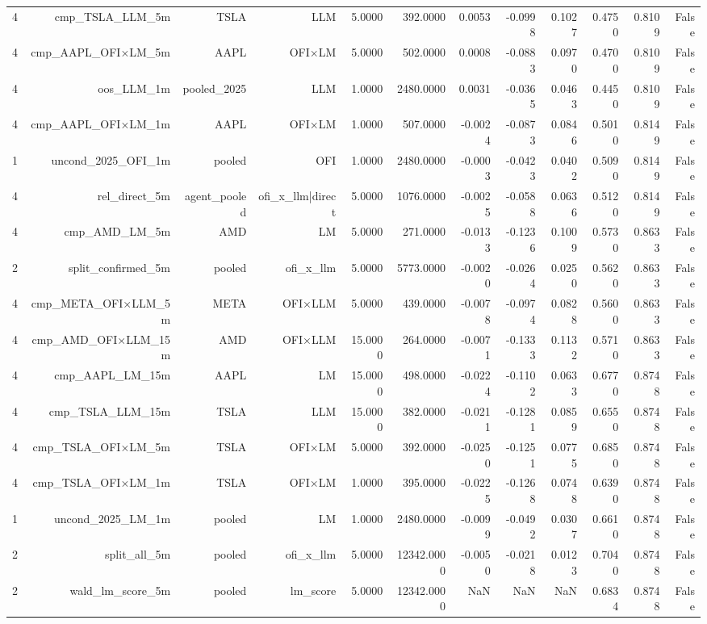\begin{table}[htbp]
\begin{tabular}{lrrrrrrrrrrr}
4 & cmp\_TSLA\_LLM\_5m & TSLA & LLM & 5.0000 & 392.0000 & 0.0053 & -0.0998 & 0.1027 & 0.4750 & 0.8109 & False \\
4 & cmp\_AAPL\_OFI×LM\_5m & AAPL & OFI×LM & 5.0000 & 502.0000 & 0.0008 & -0.0883 & 0.0970 & 0.4700 & 0.8109 & False \\
4 & oos\_LLM\_1m & pooled\_2025 & LLM & 1.0000 & 2480.0000 & 0.0031 & -0.0365 & 0.0463 & 0.4450 & 0.8109 & False \\
4 & cmp\_AAPL\_OFI×LM\_1m & AAPL & OFI×LM & 1.0000 & 507.0000 & -0.0024 & -0.0873 & 0.0846 & 0.5010 & 0.8149 & False \\
1 & uncond\_2025\_OFI\_1m & pooled & OFI & 1.0000 & 2480.0000 & -0.0003 & -0.0423 & 0.0402 & 0.5090 & 0.8149 & False \\
4 & rel\_direct\_5m & agent\_pooled & ofi\_x\_llm|direct & 5.0000 & 1076.0000 & -0.0025 & -0.0588 & 0.0636 & 0.5120 & 0.8149 & False \\
4 & cmp\_AMD\_LM\_5m & AMD & LM & 5.0000 & 271.0000 & -0.0133 & -0.1236 & 0.1009 & 0.5730 & 0.8633 & False \\
2 & split\_confirmed\_5m & pooled & ofi\_x\_llm & 5.0000 & 5773.0000 & -0.0020 & -0.0264 & 0.0250 & 0.5620 & 0.8633 & False \\
4 & cmp\_META\_OFI×LLM\_5m & META & OFI×LLM & 5.0000 & 439.0000 & -0.0078 & -0.0974 & 0.0828 & 0.5600 & 0.8633 & False \\
4 & cmp\_AMD\_OFI×LLM\_15m & AMD & OFI×LLM & 15.0000 & 264.0000 & -0.0071 & -0.1333 & 0.1132 & 0.5710 & 0.8633 & False \\
4 & cmp\_AAPL\_LM\_15m & AAPL & LM & 15.0000 & 498.0000 & -0.0224 & -0.1102 & 0.0633 & 0.6770 & 0.8748 & False \\
4 & cmp\_TSLA\_LLM\_15m & TSLA & LLM & 15.0000 & 382.0000 & -0.0211 & -0.1281 & 0.0859 & 0.6550 & 0.8748 & False \\
4 & cmp\_TSLA\_OFI×LM\_5m & TSLA & OFI×LM & 5.0000 & 392.0000 & -0.0250 & -0.1251 & 0.0775 & 0.6850 & 0.8748 & False \\
4 & cmp\_TSLA\_OFI×LM\_1m & TSLA & OFI×LM & 1.0000 & 395.0000 & -0.0225 & -0.1268 & 0.0748 & 0.6390 & 0.8748 & False \\
1 & uncond\_2025\_LM\_1m & pooled & LM & 1.0000 & 2480.0000 & -0.0099 & -0.0492 & 0.0307 & 0.6610 & 0.8748 & False \\
2 & split\_all\_5m & pooled & ofi\_x\_llm & 5.0000 & 12342.0000 & -0.0050 & -0.0218 & 0.0123 & 0.7040 & 0.8748 & False \\
2 & wald\_lm\_score\_5m & pooled & lm\_score & 5.0000 & 12342.0000 & NaN & NaN & NaN & 0.6834 & 0.8748 & False \\

\end{tabular}
\end{table}

